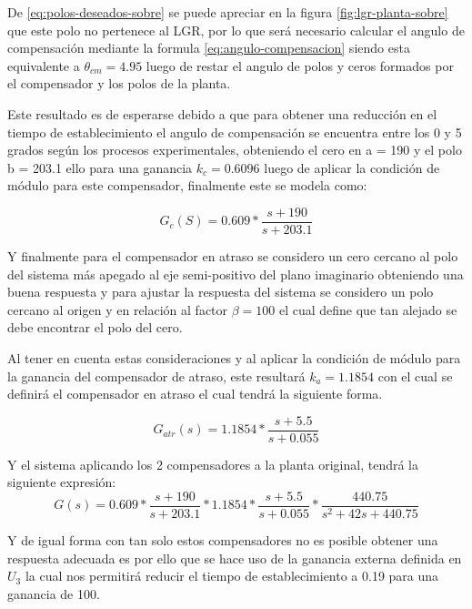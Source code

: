 \documentclass[conference]{IEEEtran}
\begin{document}
	De \ref{eq:polos-deseados-sobre} se puede apreciar en la figura \ref{fig:lgr-planta-sobre} que este polo no pertenece al LGR, por lo que será necesario calcular el angulo de compensación mediante la formula \ref{eq:angulo-compensacion} siendo esta equivalente a $\theta_{cm} = 4.95$ luego de restar el angulo de polos y ceros formados por el compensador y los polos de la planta.
	
	Este resultado es de esperarse debido a que para obtener una reducción en el tiempo de establecimiento el angulo de compensación se encuentra entre los 0 y 5 grados según los procesos experimentales, obteniendo el cero en a = 190 y el polo b = 203.1 ello para una ganancia $k_c = 0.6096$ luego de aplicar la condición de módulo para este compensador, finalmente este se modela como:
	
	\begin{equation}
		G_c(S) = 0.609*\frac{s + 190}{s + 203.1}
	\end{equation}
	
	Y finalmente para el compensador en atraso se considero un cero cercano al polo del sistema más apegado al eje semi-positivo del plano imaginario obteniendo una buena respuesta y para ajustar la respuesta del sistema se considero un polo cercano al origen y en relación al factor $\beta = 100$ el cual define que tan alejado se debe encontrar el polo del cero.
	
	Al tener en cuenta estas consideraciones y al aplicar la condición de módulo para la ganancia del compensador de atraso, este resultará $k_a = 1.1854$ con el cual se definirá el compensador en atraso el cual tendrá la siguiente forma.
	
	\begin{equation}
		G_{atr}(s) = 1.1854*\frac{s + 5.5}{s + 0.055}
		\label{eq:compensador-atr-sobre}
	\end{equation}
	
	Y el sistema aplicando los 2 compensadores a la planta original, tendrá la siguiente expresión:
	\begin{equation}
		G(s) = 0.609*\frac{s + 190}{s + 203.1}*1.1854*\frac{s + 5.5}{s + 0.055}*\frac{440.75}{s^2 + 42s + 440.75}
		\label{eq:compensador-adelanto-atr-sobre}
	\end{equation}
	
	Y de igual forma con tan solo estos compensadores no es posible obtener una respuesta adecuada es por ello que se hace uso de la ganancia externa definida en $U_3$ la cual nos permitirá reducir el tiempo de establecimiento a 0.19 para una ganancia de 100.
	
\end{document}
